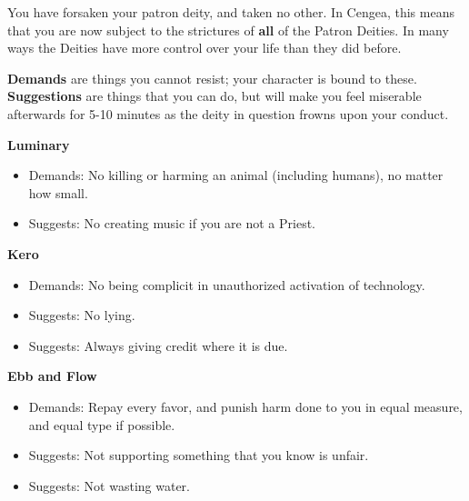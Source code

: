 \documentclass[green]{GL2020}
\begin{document}
\name{\gAbandonGods{}}

You have forsaken your patron deity, and taken no other. In Cengea, this means that you are now subject to the strictures of \textbf{all} of the Patron Deities. In many ways the Deities have more control over your life than they did before.

\textbf{Demands} are things you cannot resist; your character is bound to these.\\
\textbf{Suggestions} are things that you can do, but will make you feel miserable afterwards for 5-10 minutes as the deity in question frowns upon your conduct.

\vspace{1cm}

\textbf{Luminary}
\begin{itemize}
	\item Demands: No killing or harming an animal (including humans), no matter how small.
	\item Suggests:  No creating music if you are not a Priest.
\end{itemize}

\textbf{Kero}
\begin{itemize}
	\item Demands: No being complicit in unauthorized activation of technology.
	\item Suggests:  No lying.
	\item Suggests: Always giving credit where it is due.
\end{itemize}

\textbf{Ebb and Flow}
\begin{itemize}
	\item Demands: Repay every favor, and punish harm done to you in equal measure, and equal type if possible.
	\item Suggests: Not supporting something that you know is unfair.
	\item Suggests: Not wasting water.
\end{itemize}
\end{document}
